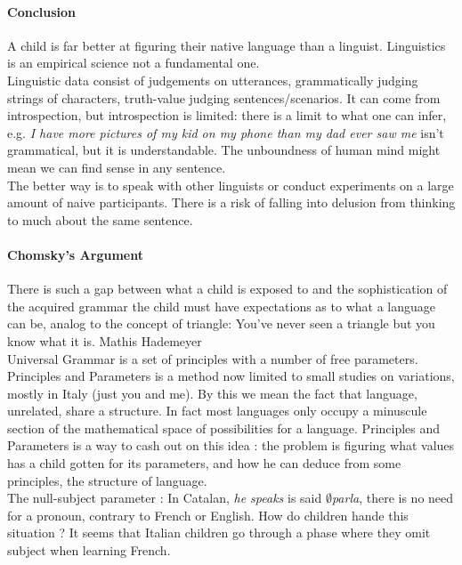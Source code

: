 \documentclass{cours}
\begin{document}
\paragraph{Conclusion}
A child is far better at figuring their native language than a linguist. Linguistics is an empirical science not a fundamental one. \\
Linguistic data consist of judgements on utterances, grammatically judging strings of characters, truth-value judging sentences/scenarios. It can come from introspection, but introspection is limited\!: there is a limit to what one can infer, e.g. \textsl{I have more pictures of my kid on my phone than my dad ever saw me} isn't grammatical, but it is understandable. The unboundness of human mind might mean we can find sense in any sentence.\\
The better way is to speak with other linguists or conduct experiments on a large amount of naive participants. There is a risk of falling into delusion from thinking to much about the same sentence. 

\paragraph{Chomsky's Argument}
There is such a gap between what a child is exposed to and the sophistication of the acquired grammar the child must have expectations as to what a language can be, analog to the concept of triangle\!: You've never seen a triangle but you know what it is. Mathis Hademeyer\\
Universal Grammar is a set of principles with a number of free parameters. \\
Principles and Parameters is a method now limited to small studies on variations, mostly in Italy (just you and me). By this we mean the fact that language, unrelated, share a structure. In fact most languages only occupy a minuscule section of the mathematical space of possibilities for a language. Principles and Parameters is a way to cash out on this idea\! : the problem is figuring what values has a child gotten for its parameters, and how he can deduce from some principles, the structure of language. \\
The null-subject parameter\! : In Catalan, \textsl{he speaks} is said $\emptyset$\textsl{parla}, there is no need for a pronoun, contrary to French or English. How do children hande this situation ? It seems that Italian children go through a phase where they omit subject when learning French.
\end{document}
